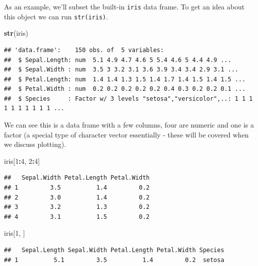 \documentclass[
]{book}
\newenvironment{Shaded}{\begin{snugshade}}{\end{snugshade}}
\newcommand{\DecValTok}[1]{\textcolor[rgb]{0.00,0.00,0.81}{#1}}
\newcommand{\KeywordTok}[1]{\textcolor[rgb]{0.13,0.29,0.53}{\textbf{#1}}}
\newcommand{\NormalTok}[1]{#1}
\newcommand{\OperatorTok}[1]{\textcolor[rgb]{0.81,0.36,0.00}{\textbf{#1}}}
\theoremstyle{definition}
\theoremstyle{definition}
\theoremstyle{definition}
\theoremstyle{remark}
\begin{document}
As an example, we'll subset the built-in \texttt{iris} data frame. To get an idea about this object we can run \texttt{str(iris)}.

\begin{Shaded}
\begin{Highlighting}[]
\KeywordTok{str}\NormalTok{(iris)}
\end{Highlighting}
\end{Shaded}

\begin{verbatim}
## 'data.frame':    150 obs. of  5 variables:
##  $ Sepal.Length: num  5.1 4.9 4.7 4.6 5 5.4 4.6 5 4.4 4.9 ...
##  $ Sepal.Width : num  3.5 3 3.2 3.1 3.6 3.9 3.4 3.4 2.9 3.1 ...
##  $ Petal.Length: num  1.4 1.4 1.3 1.5 1.4 1.7 1.4 1.5 1.4 1.5 ...
##  $ Petal.Width : num  0.2 0.2 0.2 0.2 0.2 0.4 0.3 0.2 0.2 0.1 ...
##  $ Species     : Factor w/ 3 levels "setosa","versicolor",..: 1 1 1 1 1 1 1 1 1 1 ...
\end{verbatim}

We can see this is a data frame with a few columns, four are numeric and one is a factor (a special type of character vector essentially - these will be covered when we discuss plotting).

\begin{Shaded}
\begin{Highlighting}[]
\NormalTok{iris[}\DecValTok{1}\OperatorTok{:}\DecValTok{4}\NormalTok{, }\DecValTok{2}\OperatorTok{:}\DecValTok{4}\NormalTok{]}
\end{Highlighting}
\end{Shaded}

\begin{verbatim}
##   Sepal.Width Petal.Length Petal.Width
## 1         3.5          1.4         0.2
## 2         3.0          1.4         0.2
## 3         3.2          1.3         0.2
## 4         3.1          1.5         0.2
\end{verbatim}

\begin{Shaded}
\begin{Highlighting}[]
\NormalTok{iris[}\DecValTok{1}\NormalTok{, ]}
\end{Highlighting}
\end{Shaded}

\begin{verbatim}
##   Sepal.Length Sepal.Width Petal.Length Petal.Width Species
## 1          5.1         3.5          1.4         0.2  setosa
\end{verbatim}
\end{document}
